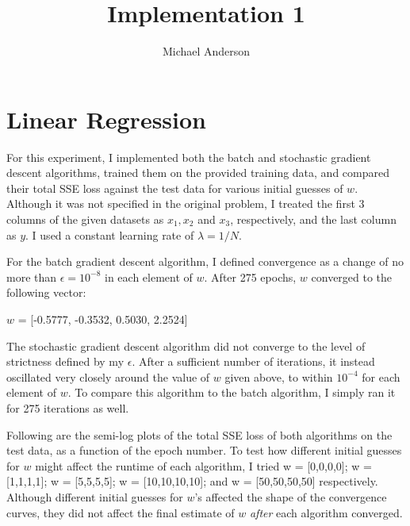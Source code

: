 \documentclass{article}
\author{Michael Anderson}
\title{Implementation 1}
\begin{document}
\setlength{\parskip}{1em}
\maketitle{}
\flushleft
\newpage

\section{Linear Regression}

For this experiment, I implemented both the batch and stochastic gradient descent algorithms, trained them on the provided training data, and compared their total SSE loss against the test data for various initial guesses of $w$. Although it was not specified in the original problem, I treated the first 3 columns of the given datasets as $x_1, x_2$ and $x_3$, respectively, and the last column as $y$. I used a constant learning rate of $\lambda = 1/N$.

For the batch gradient descent algorithm, I defined convergence as a change of no more than $\epsilon = 10^{-8}$ in each element of $w$. After 275 epochs, $w$ converged to the following vector:

$w$ = [-0.5777, -0.3532, 0.5030, 2.2524]

The stochastic gradient descent algorithm did not converge to the level of strictness defined by my $\epsilon$. After a sufficient number of iterations, it instead oscillated very closely around the value of $w$ given above, to within $10^{-4}$ for each element of $w$. To compare this algorithm to the batch algorithm, I simply ran it for 275 iterations as well.

Following are the semi-log plots of the total SSE loss of both algorithms on the test data, as a function of the epoch number. To test how different initial guesses for $w$ might affect the runtime of each algorithm, I tried w = [0,0,0,0]; w = [1,1,1,1]; w = [5,5,5,5]; w = [10,10,10,10]; and w = [50,50,50,50] respectively. Although different initial guesses for $w$'s affected the shape of the convergence curves, they did not affect the final estimate of $w$ \emph{after} each algorithm converged.
\end{document}
